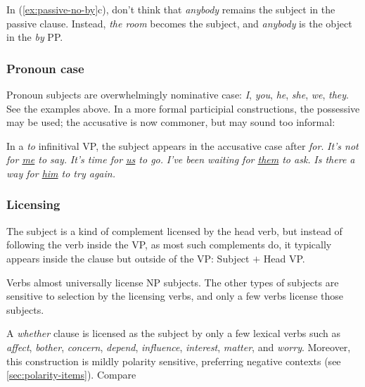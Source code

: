 In (\ref{ex:passive-no-by}c), don't think that \textit{anybody} remains the subject in the passive clause. Instead, \textit{the room} becomes the subject, and \textit{anybody} is the object in the \textit{by} PP.

\subsubsection*{Pronoun case}
Pronoun subjects are overwhelmingly nominative case: \textit{I}, \textit{you}, \textit{he}, \textit{she}, \textit{we}, \textit{they}. See the examples above. In a more formal participial constructions, the possessive may be used; the accusative is now commoner, but may sound too informal:  

\ea
    \z
\z

In a \textit{to} infinitival VP, the subject appears in the accusative case after \textit{for}. \textit{It's not for \uline{me} to say.} \textit{It's time for \uline{us} to go.} \textit{I've been waiting for \uline{them} to ask.} \textit{Is there a way for \uline{him} to try again.}

\subsubsection*{Licensing}
The subject is a kind of complement licensed by the head verb, but instead of following the verb inside the VP, as most such complements do, it typically appears inside the clause but outside of the VP: Subject $+$ Head VP.

Verbs almost universally license NP subjects. The other types of subjects are sensitive to selection by the licensing verbs, and only a few verbs license those subjects.

A \textit{whether} clause is licensed as the subject by only a few lexical verbs such as \textit{affect}, \textit{bother}, \textit{concern}, \textit{depend}, \textit{influence}, \textit{interest}, \textit{matter}, and \textit{worry}. Moreover, this construction is mildly polarity sensitive, preferring negative contexts (see \ref{sec:polarity-items}). Compare 

\ea
    \z
\z
    
